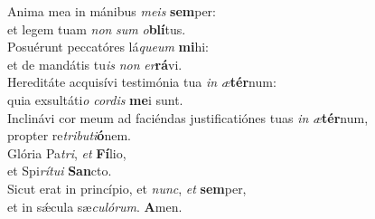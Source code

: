 \oddverse Anima mea in mánibus \textit{me}\textit{is} \textbf{sem}per:~\*\\
\oddverse et legem tuam \textit{non} \textit{sum} \textit{o}\textbf{blí}tus.\\
\evenverse Posuérunt peccatóres lá\textit{que}\textit{um} \textbf{mi}hi:~\*\\
\evenverse et de mandátis tu\textit{is} \textit{non} \textit{er}\textbf{rá}vi.\\
\oddverse Hereditáte acquisívi testimónia tua \textit{in} \textit{æ}\textbf{tér}num:~\*\\
\oddverse quia exsultáti\textit{o} \textit{cor}\textit{dis} \textbf{me}i sunt.\\
\evenverse Inclinávi cor meum ad faciéndas justificatiónes tuas \textit{in} \textit{æ}\textbf{tér}num,~\*\\
\evenverse propter re\textit{tri}\textit{bu}\textit{ti}\textbf{ó}nem.\\
\oddverse Glória Pa\textit{tri}, \textit{et} \textbf{Fí}lio,~\*\\
\oddverse et Spi\textit{rí}\textit{tu}\textit{i} \textbf{San}cto.\\
\evenverse Sicut erat in princípio, et \textit{nunc}, \textit{et} \textbf{sem}per,~\*\\
\evenverse et in sǽcula sæ\textit{cu}\textit{ló}\textit{rum}. \textbf{A}men.\\
